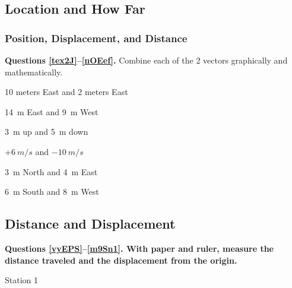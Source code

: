 \documentclass[../main-physics-problems.tex]{subfiles}
\begin{document}
\subsection{Location and How Far}
\subsubsection{Position, Displacement, and Distance}

\begin{questions}

\begin{EnvUplevel}
    \textbf{Questions \ref{tex2J}--\ref{nOEef}.} Combine each of the 2 vectors graphically and mathematically.
\end{EnvUplevel} 

\question \label{tex2J}
10 meters East and 2 meters East

\question
\SI{14}{m} East and \SI{9}{m} West

\question
\SI{3}{m} up and \SI{5}{m} down

\question 
$+\SI{6}{m/s}$ and $-\SI{10}{m/s}$

\question
\SI{3}{m} North and \SI{4}{m} East

\question \label{nOEef}
\SI{6}{m} South and \SI{8}{m} West


\clearpage
\begin{EnvUplevel}
    \subsection{Distance and Displacement}   

    \textbf{Questions \ref{vyEPS}--\ref{m9Sn1}. With paper and ruler, measure the distance traveled and the displacement from the origin.}      
\end{EnvUplevel}

\clearpage

\question \label{vyEPS}
Station 1

\begin{center}
\end{center}


\end{questions}
\end{document}
